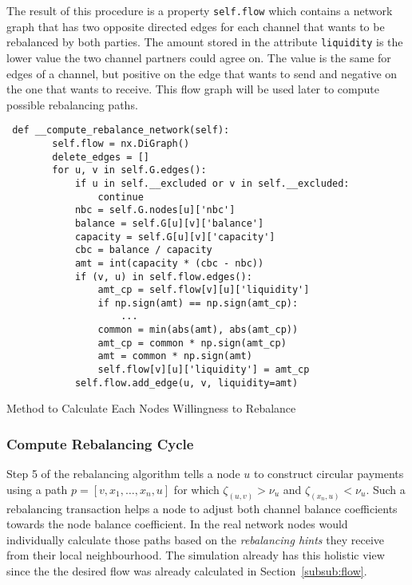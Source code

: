 \documentclass[final]{fhnwreport}       %
\begin{document}
The result of this procedure is a property \texttt{self.flow} which contains a network graph that has two opposite directed edges for each channel that wants to be rebalanced by both parties. The amount stored in the attribute \texttt{liquidity} is the lower value the two channel partners could agree on. The value is the same for edges of a channel, but positive on the edge that wants to send and negative on the one that wants to receive. This flow graph will be used later to compute possible rebalancing paths. 

\begin{listing}[H]
  \begin{verbatim}
 def __compute_rebalance_network(self):
        self.flow = nx.DiGraph()
        delete_edges = []
        for u, v in self.G.edges():
            if u in self.__excluded or v in self.__excluded:
                continue
            nbc = self.G.nodes[u]['nbc']
            balance = self.G[u][v]['balance']
            capacity = self.G[u][v]['capacity']
            cbc = balance / capacity
            amt = int(capacity * (cbc - nbc))
            if (v, u) in self.flow.edges():
                amt_cp = self.flow[v][u]['liquidity']
                if np.sign(amt) == np.sign(amt_cp):
                    ...
                common = min(abs(amt), abs(amt_cp))
                amt_cp = common * np.sign(amt_cp)
                amt = common * np.sign(amt)
                self.flow[v][u]['liquidity'] = amt_cp
            self.flow.add_edge(u, v, liquidity=amt)
  \end{verbatim}
  \caption{Method to Calculate Each Nodes Willingness to Rebalance}
  \label{code:comp_flow}
\end{listing}

\subsubsection{Compute Rebalancing Cycle}
Step 5 of the rebalancing algorithm tells a node $u$ to construct circular payments using a path $p = [v,x_1,\dots,x_n,u]$ for which $\zeta_{(u,v)}>\nu_u$ and $\zeta_{(x_n,u)}<\nu_u$. Such a rebalancing transaction helps a node to adjust both channel balance coefficients towards the node balance coefficient. In the real network nodes would individually calculate those paths based on the \emph{rebalancing hints} they receive from their local neighbourhood. The simulation already has this holistic view since the the desired flow was already calculated in Section~\ref{subsub:flow}. 
\end{document}
